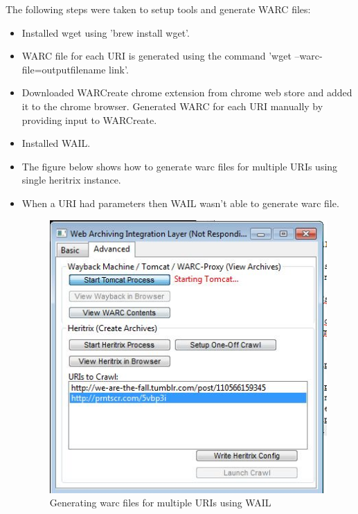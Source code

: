 The following steps were taken to setup tools and generate WARC files:
\begin{itemize}
	\item Installed wget using 'brew install wget'.
	\item WARC file for each URI is generated using the command 'wget --warc-file=outputfilename link'.
	\item Downloaded WARCreate chrome extension from chrome web store and added it to the chrome browser. Generated WARC for each 
		  URI manually by providing input to WARCreate.
		
	\item Installed WAIL.
	\item The figure below shows how to generate warc files for multiple URIs using single heritrix instance.
	\item When a URI had parameters then WAIL wasn't able to generate warc file.
		  \begin{figure}
		  	 \begin{center}
		  	 		\includegraphics[scale=0.60]{WarcUsingWAIL.jpg}
		  	 		\caption{Generating warc files for multiple URIs using WAIL}
			  \end{center}
		  \end{figure}
	\newpage
	

\end{itemize}
